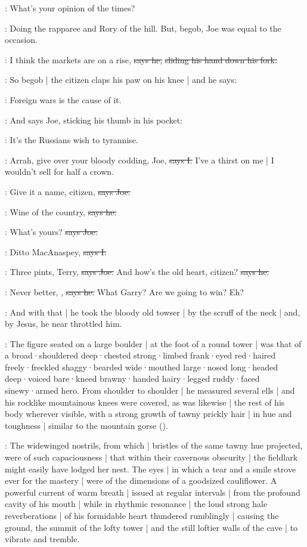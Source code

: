 \citizen:
What's your opinion of the times?

\Nq:
Doing the rapparee and Rory of the hill.
But,
begob,
Joe was equal to the occasion.

\joe:
I think the markets are on a rise,
\sout{says he,}
\sout{sliding his hand down his fork.}

\Nq:
So begob |
the citizen claps his paw on his knee |
and he says:

\citizen:
Foreign wars is the cause of it.

\Nq:
And says Joe,
sticking his thumb in his pocket:

\joe:
It's the Russians wish to tyrannise.

:
Arrah,
give over your bloody codding,
Joe,
\sout{says I.}
I've a thirst on me |
I wouldn't sell for half a crown.

\joe:
Give it a name,
citizen,
\sout{says Joe.}

\citizen:
Wine of the country,
\sout{says he.}

\joe:
What's yours?
\sout{says Joe.}

:
Ditto MacAnaspey,
\sout{says I.}

\joe:
Three pints,
Terry,
\sout{says Joe.}
And how's the old heart,
citizen?
\sout{says he.}

\citizen:
Never better,
,
\sout{says he.}
What Garry?
Are we going to win?
Eh?

\Nq:
And with that |
he took the bloody old towser |
by the scruff of the neck |
and,
by Jesus,
he near throttled him.

:
The figure seated on a large boulder |
at the foot of a round tower |
was that of
a broad·shouldered
deep·chested
strong·limbed
frank·eyed
red·haired
freely·freckled
shaggy·bearded
wide·mouthed
large·nosed
long·headed
deep·voiced
bare·kneed
brawny·handed
hairy·legged
ruddy·faced
sinewy·armed hero.
From shoulder to shoulder |
he measured several ells |
and his rocklike mountainous knees were covered,
as was likewise |
the rest of his body wherever visible,
with a strong growth of tawny prickly hair |
in hue and toughness |
similar to the mountain gorse
().

:
The widewinged nostrils,
from which |
bristles of the same tawny hue projected,
were of such capaciousness |
that within their cavernous obscurity |
the fieldlark might easily have lodged her nest.
The eyes |
in which a tear and a smile strove ever for the mastery |
were of the dimensions of a goodsized cauliflower.
A powerful current of warm breath |
issued at regular intervals |
from the profound cavity of his mouth |
while in rhythmic resonance |
the loud strong hale reverberations |
of his formidable heart thundered rumblingly |
causing the ground,
the summit of the lofty tower |
and the still loftier walls of the cave |
to vibrate and tremble.

